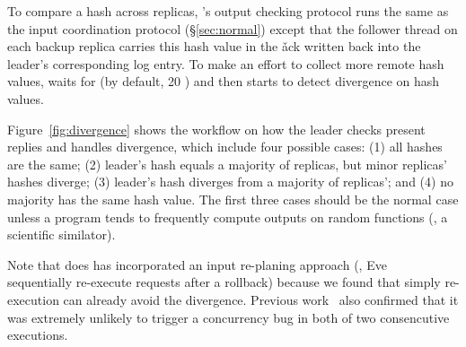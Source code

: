 To compare a hash across replicas, \xxx's output checking protocol runs the 
same as the input coordination protocol (\S\ref{sec:normal}) except that the 
follower thread on each backup replica carries this hash value in the \v{ack} 
written back into the leader's corresponding log entry. To make an effort to 
collect more remote hash values, \xxx waits for \twait (by default, 20 \us) 
and then starts to detect divergence on hash values.


Figure~\ref{fig:divergence} shows the workflow on how the leader checks 
present replies and handles divergence, which include four possible cases: 
(1) all hashes are the same; (2) leader's hash equals a majority of replicas, 
but minor replicas' hashes diverge; (3) leader's hash diverges from a majority 
of replicas'; and (4) no majority has the same hash value. The first three 
cases should be the normal case unless a program tends to frequently compute 
outputs on random functions (\eg, a scientific similator).

Note that \xxx does has incorporated an input re-planing approach (\eg, 
Eve~\cite{eve:osdi12} sequentially re-execute requests after a rollback) because 
we found that simply re-execution can already avoid the divergence. Previous 
work~\cite{lu:concurrency-bugs,pres:sosp09} also confirmed that it was 
extremely unlikely to trigger a concurrency bug in both of two consencutive 
executions.


